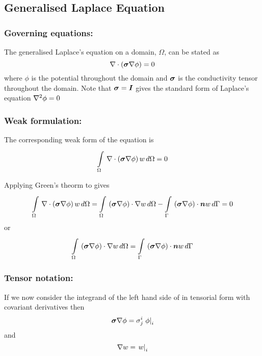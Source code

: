 \subsection{Generalised Laplace Equation}

\subsubsection{Governing equations:}
The generalised Laplace's equation on a domain, $\Omega$, can be stated as
\begin{equation}
   \nabla\cdot\left( \boldsymbol{\sigma}\nabla\phi \right) =0
  \label{eqn:Laplacesequation}
\end{equation}
where $\phi$ is the potential throughout the domain and $\boldsymbol{\sigma}$ is
the conductivity tensor throughout the domain. Note that 
$\boldsymbol{\sigma}=\boldsymbol{I}$ gives the standard form of Laplace's equation \ie $\nabla^{2} {\phi}=0$

\subsubsection{Weak formulation:}
The corresponding weak form of the equation  is
\begin{equation}
    \displaystyle\int\limits_{\Omega}^{} \, \nabla\cdot\left( \boldsymbol{\sigma}\nabla\phi \right) w\,d\Omega =0
  \label{eqn:Laplaceweakform}
\end{equation}

Applying Green's theorm to  gives
\begin{equation}
  \gint{\Omega}{}{\diverg{\pbrac{\tensor{\sigma}\grad\phi}}w}{\Omega}= 
  \gint{\Omega}{}{\dotprod{\pbrac{\tensor{\sigma}\grad\phi}}{\grad w}}{\Omega}-
  \gint{\Gamma}{}{\dotprod{\pbrac{\tensor{\sigma}\grad\phi}}{\vect{n}}w}{\Gamma}
  =0
\end{equation}
or
\begin{equation}
  \gint{\Omega}{}{\dotprod{\pbrac{\tensor{\sigma}\grad\phi}}{\grad w}}{\Omega}=
  \gint{\Gamma}{}{\dotprod{\pbrac{\tensor{\sigma}\grad\phi}}{\vect{n}w}}{\Gamma}
  \label{eqn:Laplaceweightedresidualform}
\end{equation}

\subsubsection{Tensor notation:}
If we now consider the integrand of the left hand side of
 in tensorial form with covariant
derivatives then
\begin{equation}
  \boldsymbol{\sigma}\nabla\phi = \sigma^{i}_{j} \left. \phi \right|_{i} 
\end{equation}
and
\begin{equation}
  \nabla w =  \left. w \right|_{i} 
\end{equation}

